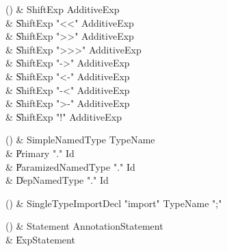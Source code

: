 \begin{bbgrammarappendix}

() & ShiftExp \label{prod:ShiftExp}  \: AdditiveExp  \\

 &    \| ShiftExp \xcd"<<" AdditiveExp \\
 &    \| ShiftExp \xcd">>" AdditiveExp \\
 &    \| ShiftExp \xcd">>>" AdditiveExp \\
 &    \| ShiftExp  \xcd"->" AdditiveExp  \\
 &    \| ShiftExp  \xcd"<-" AdditiveExp  \\
 &    \| ShiftExp  \xcd"-<" AdditiveExp  \\
 &    \| ShiftExp  \xcd">-" AdditiveExp  \\
 &    \| ShiftExp  \xcd"!" AdditiveExp  \\

\end{bbgrammarappendix}

\begin{bbgrammarappendix}

() & SimpleNamedType \label{prod:SimpleNamedType}  \: TypeName  \\

 &    \| Primary \xcd"." Id \\
 &    \| ParamizedNamedType \xcd"." Id \\
 &    \| DepNamedType \xcd"." Id \\

\end{bbgrammarappendix}

\begin{bbgrammarappendix}

() & SingleTypeImportDecl \label{prod:SingleTypeImportDecl}  \: \xcd"import" TypeName \xcd";"  \\


\end{bbgrammarappendix}

\begin{bbgrammarappendix}

() & Statement \label{prod:Statement}  \: AnnotationStatement  \\

 &    \| ExpStatement \\

\end{bbgrammarappendix}

